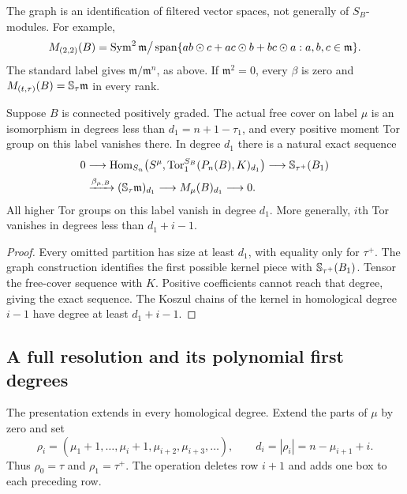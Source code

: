 The graph is an identification of filtered vector spaces, not generally
of $S_B$-modules. For example,
\[
 M_{(2,2)}(B)=\operatorname{Sym}^2\mathfrak m\big/
 \operatorname{span}\{ab\odot c+ac\odot b+bc\odot a:a,b,c\in\mathfrak m\}.
\]
The standard label gives $\mathfrak m/\mathfrak m^n$, as above.
If $\mathfrak m^2=0$, every $\beta$ is zero and
$M_{(t,\tau)}(B)=\mathbb S_\tau\mathfrak m$ in every rank.

\begin{proposition}
\label{prop:first-schur-obstruction}
Suppose $B$ is connected positively graded. The actual free cover on
label $\mu$ is an isomorphism in degrees less than $d_1=n+1-\tau_1$,
and every positive moment Tor group on this label vanishes there.
In degree $d_1$ there is a natural exact sequence
\begin{align*}
 0&\longrightarrow
 \operatorname{Hom}_{S_n}\bigl(S^\mu,\operatorname{Tor}_1^{S_B}(P_n(B),K)_{d_1}\bigr)
 \longrightarrow\mathbb S_{\tau^+}(B_1)\\
 &\xrightarrow{\beta_{\mu,B}}(\mathbb S_\tau\mathfrak m)_{d_1}
       \longrightarrow M_\mu(B)_{d_1}\longrightarrow0.
\end{align*}
All higher Tor groups on this label vanish in degree $d_1$.
More generally, $i$th Tor vanishes in degrees less than $d_1+i-1$.
\end{proposition}
\begin{proof}
Every omitted partition has size at least $d_1$, with equality only
for $\tau^+$. The graph construction identifies the first possible
kernel piece with $\mathbb S_{\tau^+}(B_1)$. Tensor the free-cover
sequence with $K$. Positive coefficients cannot reach that degree,
giving the exact sequence. The Koszul chains of the kernel in
homological degree $i-1$ have degree at least $d_1+i-1$.
\end{proof}

\subsection{A full resolution and its polynomial first degrees}
\label{sec:schur-resolution-statements}

The presentation extends in every homological degree. Extend the parts
of $\mu$ by zero and set
\begin{equation}\label{eq:schur-resolution-shapes}
 \rho_i=(\mu_1+1,\ldots,\mu_i+1,\mu_{i+2},\mu_{i+3},\ldots),
 \qquad d_i=|\rho_i|=n-\mu_{i+1}+i.
\end{equation}
Thus $\rho_0=\tau$ and $\rho_1=\tau^+$. The operation deletes row
$i+1$ and adds one box to each preceding row.

